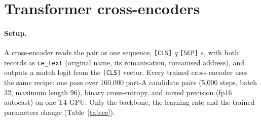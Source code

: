 \section{Transformer cross-encoders}
\label{sec:ce}

\paragraph{Setup.} A cross-encoder reads the pair as one sequence, \texttt{[CLS]} $q$ \texttt{[SEP]} $s$, with both
records as \texttt{ce\_text} (original name, its romanisation, romanised address), and outputs a match
logit from the \texttt{[CLS]} vector. Every trained cross-encoder uses the same
recipe: one pass over 160,000 part-A candidate pairs (5,000 steps, batch 32, maximum length 96), binary
cross-entropy, and mixed precision (fp16 autocast) on one T4 GPU. Only the backbone, the learning rate and the
trained parameters change (Table~\ref{tab:ce}).

\begin{table}[h]
\centering\small
{}
\caption{Cross-encoders on the test split. -- share the backbone.}
\label{tab:ce}
\end{table}

